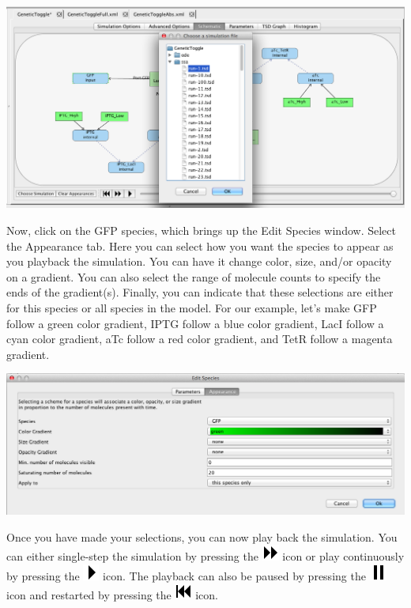 \documentclass[titlepage,11pt]{article}
\begin{document}
\begin{center}
\includegraphics[width=160mm]{screenshots/chooseSimGT}
\end{center}

Now, click on the GFP species, which brings up the Edit Species window.  Select the Appearance tab.  Here you can select how you want the species to appear as you playback the simulation.  You can have it change color, size, and/or opacity on a gradient.  You can also select the range of molecule counts to specify the ends of the gradient(s).  Finally, you can indicate that these selections are either for this species or all species in the model.  For our example, let's make GFP  follow a green color gradient, IPTG follow a blue color gradient, LacI follow a cyan color gradient, aTc follow a red color gradient, and TetR follow a magenta gradient.
\begin{center}
\includegraphics[width=160mm]{screenshots/editSpeciesAppearanceGT}
\end{center}

Once you have made your selections, you can now play back the simulation.  You can either single-step the simulation by pressing the \includegraphics{../gui/icons/modelview/movie/single_step} icon or play continuously by pressing the \includegraphics{../gui/icons/modelview/movie/play} icon.  The playback can also be paused by pressing the \includegraphics{../gui/icons/modelview/movie/pause} icon and restarted by pressing the  \includegraphics{../gui/icons/modelview/movie/rewind} icon. 
\end{document}
